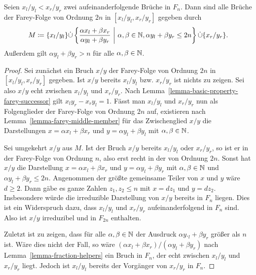 \begin{lemma}\label{lemma-candidates-next-farey-bound}
	Seien $x_l/y_l < x_r/y_r$ zwei aufeinanderfolgende Brüche in $F_n$.
	Dann sind alle Brüche der Farey-Folge von Ordnung $2n$ in $[x_l/y_l, x_r/y_r]$ gegeben durch
	\[
		M\coloneq \{ x_l/y_l \} \dot\cup \left\{ \frac{\alpha x_l + \beta x_r}{\alpha y_l + \beta y_r} ~\middle\vert~ \alpha,\beta\in\mathbb{N}, \alpha y_l + \beta y_r\leq 2n \right\} \dot\cup \{ x_r/y_r \}.
	\]
	Außerdem gilt $\alpha y_l + \beta y_r > n$ für alle $\alpha,\beta \in\mathbb{N}$.
\end{lemma}
\begin{proof}
	Sei zunächst ein Bruch $x/y$ der Farey-Folge von Ordnung $2n$ in $[x_l / y_l, x_r/y_r]$ gegeben.
	Ist $x/y$ bereits $x_l/y_l$ bzw. $x_r/y_r$ ist nichts zu zeigen.
	Sei also $x/y$ echt zwischen $x_l/y_l$ und $x_r/y_r$.
	Nach Lemma~\ref{lemma-basic-property-farey-successor} gilt $x_ly_r - x_ry_l = 1$.
	Fässt man $x_l/y_l$ und $x_r/y_r$ nun als Folgenglieder der Farey-Folge von Ordnung $2n$ auf, existieren nach Lemma~\ref{lemma-farey-middle-member} für das Zwischenglied $x/y$ die Darstellungen $x = \alpha x_l + \beta x_r$ und $y= \alpha y_l + \beta y_l$ mit $\alpha, \beta \in\mathbb{N}$.
	
	Sei umgekehrt $x/y$ aus $M$.
	Ist der Bruch $x/y$ bereits $x_l/y_l$ oder $x_r/y_r$, so ist er in der Farey-Folge von Ordnung $n$, also erst recht in der von Ordnung $2n$.
	Sonst hat $x/y$ die Darstellung $x=\alpha x_l + \beta x_r$ und $y=\alpha y_l + \beta y_r$ mit $\alpha,\beta\in\mathbb{N}$ und $\alpha y_l + \beta y_r \leq 2n$.
	Angenommen der größte gemeinsame Teiler von $x$ und $y$ wäre $d\geq 2$.
	Dann gäbe es ganze Zahlen $z_1, z_2 \leq n$ mit $x=d z_1$ und $y=d z_2$.
	Insbesondere würde die irreduzible Darstellung von $x/y$ bereits in $F_n$ liegen.
	Dies ist ein Widerspruch dazu, dass $x_l/y_l$ und $x_r/y_r$ aufeinanderfolgend in $F_n$ sind.
	Also ist $x/y$ irreduzibel und in $F_{2n}$ enthalten.
	
	Zuletzt ist zu zeigen, dass für alle $\alpha,\beta\in\mathbb{N}$ der Ausdruck $\alpha y._l + \beta y_r$ größer als $n$ ist.
	Wäre dies nicht der Fall, so wäre $(\alpha x_l + \beta x_r) / (\alpha y_l + \beta y_r)$ nach Lemma~\ref{lemma-fraction-helpers} ein Bruch in $F_n$, der echt zwischen $x_l/y_l$ und $x_r/y_r$ liegt.
	Jedoch ist $x_l/y_l$ bereits der Vorgänger von $x_r/y_r$ in $F_n$.
\end{proof}

